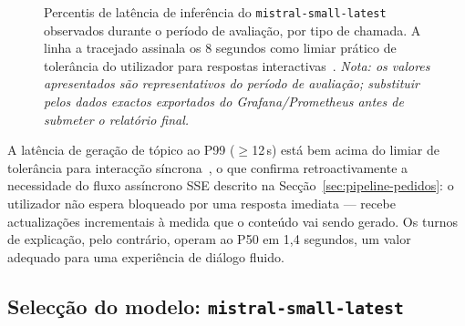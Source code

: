 \begin{figure}[htbp]
    \caption[Latência de inferência por tipo de chamada (P50 / P95 / P99)]{Percentis de latência de inferência do \texttt{mistral-small-latest} observados durante o período de avaliação, por tipo de chamada. A linha a tracejado assinala os 8 segundos como limiar prático de tolerância do utilizador para respostas interactivas~\cite{miller1968response}. \emph{Nota: os valores apresentados são representativos do período de avaliação; substituir pelos dados exactos exportados do Grafana/Prometheus antes de submeter o relatório final.}}
    \label{fig:latencia-inferencia}
\end{figure}

A latência de geração de tópico ao P99 ($\geq$12\,s) está bem acima do limiar de tolerância para interacção síncrona~\cite{miller1968response}, o que confirma retroactivamente a necessidade do fluxo assíncrono SSE descrito na Secção~\ref{sec:pipeline-pedidos}: o utilizador não espera bloqueado por uma resposta imediata --- recebe actualizações incrementais à medida que o conteúdo vai sendo gerado. Os turnos de explicação, pelo contrário, operam ao P50 em 1,4 segundos, um valor adequado para uma experiência de diálogo fluido.

\subsection{Selecção do modelo: \texttt{mistral-small-latest}}
\label{ssec:selecao-modelo}

